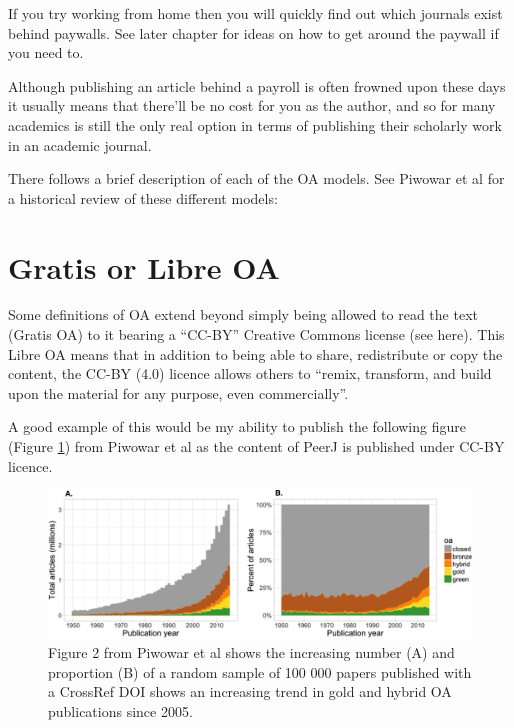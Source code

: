 \documentclass[
]{krantz}
\begin{document}
If you try working from home then you will quickly find out which journals exist behind paywalls. See later chapter for ideas on how to get around the paywall if you need to.

Although publishing an article behind a payroll is often frowned upon these days it usually means that there'll be no cost for you as the author, and so for many academics is still the only real option in terms of publishing their scholarly work in an academic journal.

There follows a brief description of each of the OA models. See Piwowar et al \citeyearpar{piwowar2018state} for a historical review of these different models:

\hypertarget{gratis-or-libre-oa}{%
\section{Gratis or Libre OA}\label{gratis-or-libre-oa}}

Some definitions of OA extend beyond simply being allowed to read the text (Gratis OA) to it bearing a ``CC-BY'' Creative Commons license (see here). This Libre OA means that in addition to being able to share, redistribute or copy the content, the CC-BY (4.0) licence allows others to ``remix, transform, and build upon the material for any purpose, even commercially''.

A good example of this would be my ability to publish the following figure (Figure \ref{fig:Piwowar}) from Piwowar et al \citeyearpar{piwowar2018state} as the content of PeerJ is published under CC-BY licence.



\begin{figure}
\includegraphics[width=0.95\linewidth]{figures/Piwowar} \caption{Figure 2 from Piwowar et al \citeyearpar{piwowar2018state} shows the increasing number (A) and proportion (B) of a random sample of 100 000 papers published with a CrossRef DOI shows an increasing trend in gold and hybrid OA publications since 2005.}\label{fig:Piwowar}
\end{figure}
\end{document}
